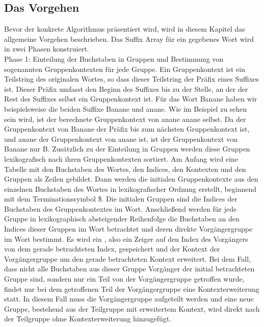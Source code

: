 \newpage
\subsection{Das Vorgehen}
\label{gsaca:chapter2}
%
Bevor der konkrete Algorithmus pr{\"a}sentiert  wird, wird in diesem Kapitel das allgemeine Vorgehen beschrieben. Das Suffix Array f{\"u}r ein gegebenes Wort wird in zwei Phasen konstruiert.\\

Phase 1: Einteilung der Buchstaben in Gruppen und Bestimmung von sogenannten Gruppenkontexten f{\"u}r jede Gruppe. Ein Gruppenkontext ist ein Teilstring des originalen Wortes, so dass dieser Teilstring der Pr{\"a}fix eines Suffixes ist. Dieser Pr{\"a}fix umfasst den Beginn des Suffixes bis zu der Stelle, an der der Rest des Suffixes selbst ein Gruppenkontext ist. F{\"u}r das Wort Banane haben wir beispielsweise die beiden Suffixe Banane und anane. Wie im Beispiel zu sehen sein wird, ist der berechnete Gruppenkontext von anane anane selbst. Da der Gruppenkontext von Banane der Pr{\"a}fix bis zum n{\"a}chsten Gruppenkontext ist, und anane der Gruppenkontext von anane ist, ist der Gruppenkontext von Banane nur B. Zus{\"a}tzlich zu der Einteilung in Gruppen werden diese Gruppen lexikografisch nach ihren Gruppenkontexten sortiert. 
Am Anfang wird eine Tabelle mit den Buchstaben des Wortes, den Indices, den Kontexten und den Gruppen als Zeilen gebildet. Dann werden die initialen Gruppenkontexte aus den einzelnen Buchstaben des Wortes in lexikografischer Ordnung erstellt, beginnend mit dem Terminationssymbol \$. Die initialen Gruppen sind die Indices der Buchstaben des Gruppenkontextes im Wort. Anschlie{\ss}end werden f{\"u}r jede Gruppe in lexikographisch absteigender Reihenfolge die Buchstaben an den Indices dieser Gruppen im Wort betrachtet und deren direkte Vorg{\"a}ngergruppe im Wort bestimmt. Es wird ein \prevpointer, also ein Zeiger auf den Index des Vorg{\"a}ngers von dem gerade betrachteten Index, gespeichert und der Kontext der Vorg{\"a}ngergruppe um den gerade betrachteten Kontext erweitert. Bei dem Fall, dass nicht alle Buchstaben aus dieser Gruppe Vorg{\"a}nger der initial betrachteten Gruppe sind, sondern nur ein Teil von der Vorg{\"a}ngergruppe getroffen wurde, findet nur bei dem getroffenen Teil der Vorg{\"a}ngergruppe eine Kontexterweiterung statt. In diesem Fall muss die Vorg{\"a}ngergruppe aufgeteilt werden und eine neue Gruppe, bestehend aus der Teilgruppe mit erweitertem Kontext, wird direkt nach der Teilgruppe ohne Kontexterweiterung hinzugef{\"u}gt. \\


